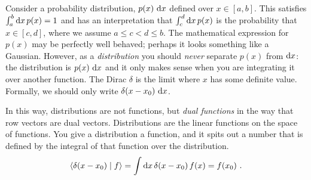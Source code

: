 \begin{subappendices}
Consider a probability distribution, $p(x)\,\operatorname{d}\mkern-3mu^{}\mkern-1mu{x}$ defined over $x\in [a,b]$. This satisfies $\int_a^b \operatorname{d}\mkern-3mu^{}\mkern-1mu{x}\, p(x) = 1$ and has an interpretation that
$
    \int_c^d \operatorname{d}\mkern-3mu^{}\mkern-1mu{x}\, p(x)
$
is the probability that $x \in [c,d]$, where we assume $a\leq c < d \leq b$. The mathematical expression for $p(x)$ may be perfectly well behaved; perhaps it looks something like a Gaussian. However, as a \emph{distribution} you should \emph{never} separate $p(x)$ from $\operatorname{d}\mkern-3mu^{}\mkern-1mu{x}$: the distribution is $p(x)\,\operatorname{d}\mkern-3mu^{}\mkern-1mu{x}$ and it only makes sense when you are integrating it over another function. The Dirac $\delta$ is the limit where $x$ has some definite value. Formally, we should only write $\delta(x-x_0)\,\operatorname{d}\mkern-3mu^{}\mkern-1mu{x}$.

In this way, distributions are not functions, but \emph{dual functions} in the way that row vectors are dual vectors. Distributions are the linear functions on the space of functions. You give a distribution a function, and it spits out a number that is defined by the integral of that function over the distribution. 
\begin{align}
    \langle \delta(x-x_0) \mid f \rangle = \int \operatorname{d}\mkern-3mu^{}\mkern-1mu{x}\, \delta(x-x_0)\, f(x) = f(x_0) \ .
\end{align}






\end{subappendices}

